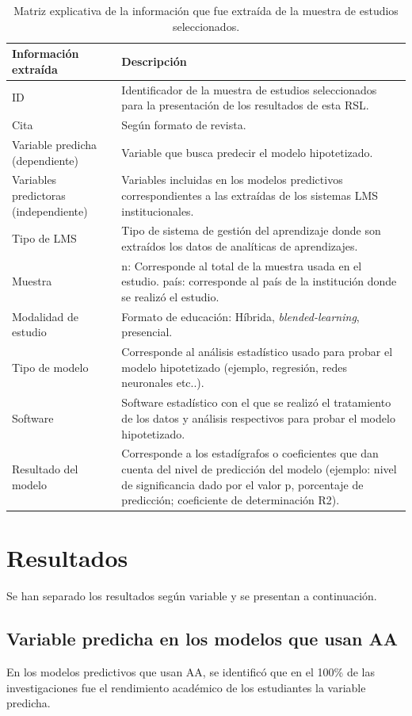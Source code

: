 \documentclass[spanish]{textolivre}
\begin{document}
\begin{table}[htpb]
\caption{Matriz explicativa de la información que fue extraída de la muestra de estudios seleccionados.}
\label{tab1}
\begin{tabular}{p{}p{}}
\toprule 
Información extraída & Descripción
\\ 
\midrule
ID & Identificador de la muestra de estudios seleccionados para la presentación de los resultados de esta RSL.
\\
Cita & Según formato de revista.
\\
Variable predicha (dependiente) & Variable que busca predecir el modelo hipotetizado.
\\
Variables predictoras (independiente) & Variables incluidas en los modelos predictivos correspondientes a las extraídas de los sistemas LMS institucionales.
\\
Tipo de LMS & Tipo de sistema de gestión del aprendizaje donde son extraídos los datos de analíticas de aprendizajes.
\\
Muestra & n: Corresponde al total de la muestra usada en el estudio. \newline país: corresponde al país de la institución donde se realizó el estudio.
\\
Modalidad de estudio & Formato de educación: Híbrida, \emph{blended-learning}, presencial.
\\
Tipo de modelo & Corresponde al análisis estadístico usado para probar el modelo hipotetizado (ejemplo, regresión, redes neuronales etc..).
\\
Software & Software estadístico con el que se realizó el tratamiento de los datos y análisis respectivos para probar el modelo hipotetizado.
\\
Resultado del modelo & Corresponde a los estadígrafos o coeficientes que dan cuenta del nivel de predicción del modelo (ejemplo: nivel de significancia dado por el valor p, porcentaje de predicción; coeficiente de determinación R2).
\\ 
\bottomrule
\end{tabular}
\end{table}

\section{Resultados}
Se han separado los resultados según variable y se presentan a continuación.

\subsection*{Variable predicha en los modelos que usan AA}
En los modelos predictivos que usan AA, se identificó que en el 100\% de las investigaciones fue el rendimiento académico de los estudiantes la variable predicha.
\end{document}
